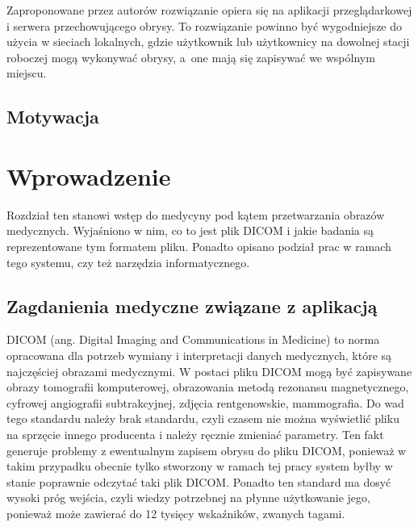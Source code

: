 \documentclass[a4paper,11pt,twoside,openright]{report}
\theoremstyle{definition}
\begin{document}
Zaproponowane przez autorów rozwiązanie opiera się na aplikacji przeglądarkowej i serwera przechowującego obrysy. To rozwiązanie powinno być wygodniejsze do użycia w sieciach lokalnych, gdzie użytkownik lub użytkownicy na dowolnej stacji roboczej mogą wykonywać obrysy, a~one mają się zapisywać we wspólnym miejscu.

\section*{Motywacja}



\chapter {Wprowadzenie}

Rozdział ten stanowi wstęp do medycyny pod kątem przetwarzania obrazów medycznych. Wyjaśniono w nim, co to jest plik DICOM i jakie badania są reprezentowane tym formatem pliku. Ponadto opisano podział prac w ramach tego systemu, czy też narzędzia informatycznego.

\section {Zagdanienia medyczne związane z aplikacją}

DICOM (ang. Digital Imaging and Communications in Medicine) \cite{DICOM} to norma opracowana dla potrzeb wymiany i interpretacji danych medycznych, które są najczęściej obrazami medycznymi. W postaci pliku DICOM mogą być zapisywane obrazy tomografii komputerowej, obrazowania metodą rezonansu magnetycznego, cyfrowej angiografii subtrakcyjnej, zdjęcia rentgenowskie, mammografia. Do wad tego standardu należy brak standardu, czyli czasem nie można wyświetlić pliku na sprzęcie innego producenta i należy ręcznie zmieniać parametry. Ten fakt generuje problemy z ewentualnym zapisem obrysu do pliku DICOM, ponieważ w takim przypadku obecnie tylko stworzony w ramach tej pracy system byłby w stanie poprawnie odczytać taki plik DICOM. Ponadto ten standard ma dosyć wysoki próg wejścia, czyli wiedzy potrzebnej na płynne użytkowanie jego, ponieważ może zawierać do 12 tysięcy wskaźników, zwanych tagami.
\end{document}
